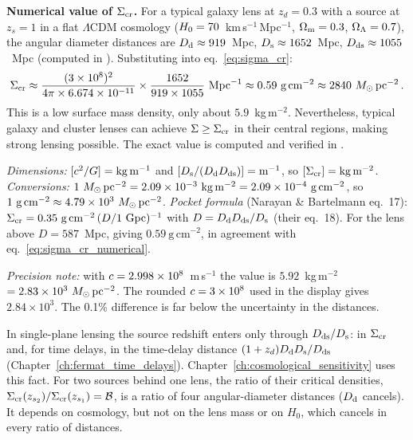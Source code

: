 \begin{example}
\textbf{Numerical value of $\Sigma_{\mathrm{cr}}$.}
For a typical galaxy lens at $z_d = 0.3$ with a source at $z_s = 1$
in a flat $\Lambda$CDM cosmology ($H_0 = 70$~km\,s$^{-1}$\,Mpc$^{-1}$,
$\Omega_{\mathrm{m}} = 0.3$, $\Omega_{\Lambda} = 0.7$), the angular diameter distances are
$D_{\mathrm{d}} \approx 919$~Mpc, $D_{\mathrm{s}} \approx 1652$~Mpc,
$D_{\mathrm{ds}} \approx 1055$~Mpc (computed in
).
Substituting into eq.~\eqref{eq:sigma_cr}:
\begin{equation}
    \Sigma_{\mathrm{cr}} \approx \frac{(3 \times 10^{8})^2}{4\pi \times
    6.674 \times 10^{-11}} \times
    \frac{1652}{919 \times 1055}~\text{Mpc}^{-1}
    \approx 0.59~\text{g\,cm}^{-2}
    \approx 2840~M_{\odot}\,\text{pc}^{-2} \,.
    \label{eq:sigma_cr_numerical}
\end{equation}
This is a low surface mass density, only about
$5.9$~kg\,m$^{-2}$.  Nevertheless, typical galaxy and cluster lenses
can achieve $\Sigma \geq \Sigma_{\mathrm{cr}}$ in their central regions, making
strong lensing possible.  The exact value is computed and verified in
.
\end{example}
\begin{annotation}
\emph{Dimensions:} $[c^2/G] = \mathrm{kg\,m^{-1}}$ and
$[D_{\mathrm{s}}/(D_{\mathrm{d}}D_{\mathrm{ds}})] = \mathrm{m^{-1}}$, so $[\Sigma_{\mathrm{cr}}] = \mathrm{kg\,m^{-2}}$.
\emph{Conversions:} $1~M_{\odot}\,\mathrm{pc}^{-2} = 2.09\times10^{-3}~\mathrm{kg\,m^{-2}}
= 2.09\times10^{-4}~\mathrm{g\,cm^{-2}}$, so
$1~\mathrm{g\,cm^{-2}} \approx 4.79\times10^{3}~M_{\odot}\,\mathrm{pc}^{-2}$.
\emph{Pocket formula} (Narayan \& Bartelmann eq.~17):
$\Sigma_{\mathrm{cr}} = 0.35~\mathrm{g\,cm^{-2}}\,(D/1~\mathrm{Gpc})^{-1}$ with
$D = D_{\mathrm{d}}D_{\mathrm{ds}}/D_{\mathrm{s}}$ (their eq.~18). For the lens above $D = 587$~Mpc, giving
$0.59~\mathrm{g\,cm^{-2}}$, in agreement with
eq.~\eqref{eq:sigma_cr_numerical}.

\emph{Precision note:} with $c = 2.998\times10^{8}$~m\,s$^{-1}$ the
value is $5.92$~kg\,m$^{-2}$ $= 2.83\times10^{3}~M_{\odot}\,\mathrm{pc}^{-2}$. The
rounded $c = 3\times10^{8}$ used in the display gives
$2.84\times10^{3}$. The 0.1\% difference is far below the uncertainty
in the distances.
\end{annotation}
\begin{bridge}
In single-plane lensing the source redshift enters only through
$D_{\mathrm{ds}}/D_{\mathrm{s}}$: in $\Sigma_{\mathrm{cr}}$ and, for time delays, in the time-delay distance
$(1+z_d)D_{\mathrm{d}}D_{\mathrm{s}}/D_{\mathrm{ds}}$ (Chapter~\ref{ch:fermat_time_delays}).
Chapter~\ref{ch:cosmological_sensitivity} uses this fact.
For two sources behind one lens, the ratio of their critical densities,
$\Sigma_{\mathrm{cr}}(z_{s_2})/\Sigma_{\mathrm{cr}}(z_{s_1}) = \mathcal{B}$, is a ratio of four
angular-diameter distances ($D_{\mathrm{d}}$ cancels). It depends on cosmology, but not on the lens mass or on
$H_0$, which cancels in every ratio of distances.
\end{bridge}

